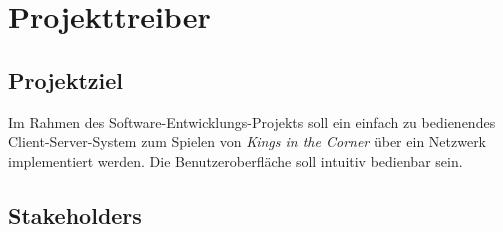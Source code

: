 \chapter{Projekttreiber}

\section{Projektziel}

Im Rahmen des Software-Entwicklungs-Projekts {\the\year} soll ein einfach zu bedienendes Client-Server-System zum Spielen von \textit{Kings in the Corner} über ein Netzwerk implementiert werden. Die Benutzeroberfläche soll intuitiv bedienbar sein.

\section{Stakeholders}

\setcounter{sh}{10}

